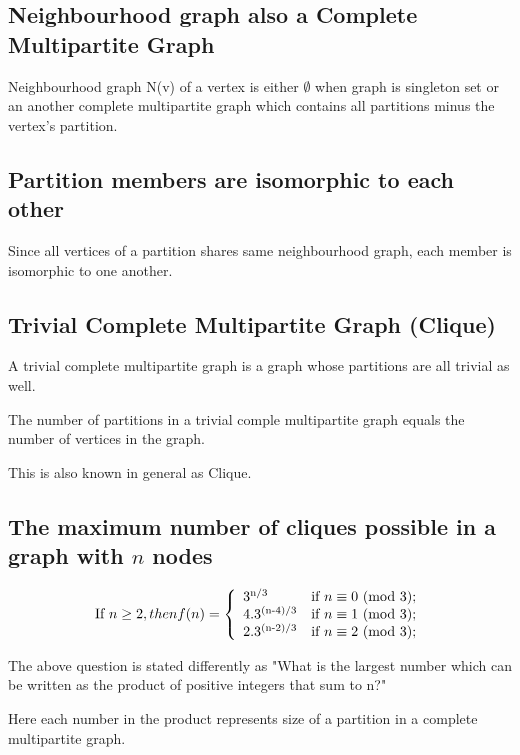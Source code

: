\documentclass[12pt]{article}
\theoremstyle{plain}
\theoremstyle{definition}
\begin{document}
\subsection{Neighbourhood graph also a Complete Multipartite Graph}
Neighbourhood graph N(v) of a vertex is either $\emptyset$ when graph is singleton set or an another complete multipartite graph which contains all partitions minus the vertex's partition.

\subsection{Partition members are isomorphic to each other}
Since all vertices of a partition shares same neighbourhood graph, each member is isomorphic to one another.

\subsection{Trivial Complete Multipartite Graph (Clique)} \label{Clique}
A trivial complete multipartite graph is a graph whose partitions are all trivial as well.

The number of partitions in a trivial comple multipartite graph equals the number of vertices in the graph.

This is also known in general as Clique.

\subsection{The maximum number of cliques possible in a graph with $n$ nodes}
\citet{MM60} \citet{MoonMoser65} 

\begin{equation}
\mbox{If } n \geq 2, then f(n) =
\left\{ 
\begin{array}{ll}
3\textsuperscript{n/3} & \mbox{if $n \equiv 0$ (mod 3);} \\
4.3\textsuperscript{(n-4)/3} & \mbox{if $n \equiv 1$ (mod 3);} \\
2.3\textsuperscript{(n-2)/3} & \mbox{if $n \equiv 2$ (mod 3);} \\
\end{array} \right.
\end{equation}

The above question is stated differently as "What is the largest number which can be written as the product of positive integers that sum to n?" \citet{Vatter}

Here each number in the product represents size of a partition in a complete multipartite graph.
\end{document}
